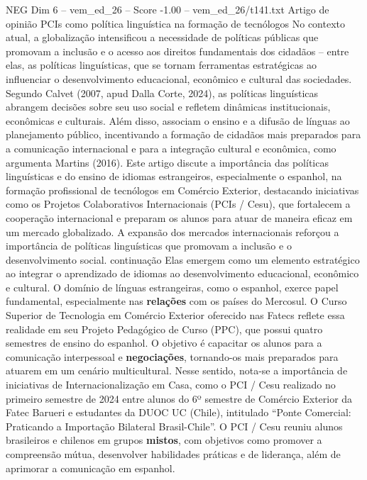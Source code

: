 \begin{textsample}{NEG Dim 6 – vem\_ed\_26 – Score -1.00 – vem\_ed\_26/t141.txt}  \label{ex:f6_neg_020}
Artigo de opinião PCIs como política linguística na formação de tecnólogos No contexto atual, a globalização intensificou a necessidade de políticas públicas que promovam a inclusão e o acesso aos direitos fundamentais dos cidadãos – entre elas, as políticas linguísticas, que se tornam ferramentas estratégicas ao influenciar o desenvolvimento educacional, econômico e cultural das sociedades.
Segundo Calvet (2007, apud Dalla Corte, 2024), as políticas linguísticas abrangem decisões sobre seu uso social e refletem dinâmicas institucionais, econômicas e culturais.
Além disso, associam o ensino e a difusão de línguas ao planejamento público, incentivando a formação de cidadãos mais preparados para a comunicação internacional e para a integração cultural e econômica, como argumenta Martins (2016).
Este artigo discute a importância das políticas linguísticas e do ensino de idiomas estrangeiros, especialmente o espanhol, na formação profissional de tecnólogos em Comércio Exterior, destacando iniciativas como os Projetos Colaborativos Internacionais (PCIs / Cesu), que fortalecem a cooperação internacional e preparam os alunos para atuar de maneira eficaz em um mercado globalizado.
A expansão dos mercados internacionais reforçou a importância de políticas linguísticas que promovam a inclusão e o desenvolvimento social. continuação Elas emergem como um elemento estratégico ao integrar o aprendizado de idiomas ao desenvolvimento educacional, econômico e cultural.
O domínio de línguas estrangeiras, como o espanhol, exerce papel fundamental, especialmente nas \textbf{relações} com os países do Mercosul.
O Curso Superior de Tecnologia em Comércio Exterior oferecido nas Fatecs reflete essa realidade em seu Projeto Pedagógico de Curso (PPC), que possui quatro semestres de ensino do espanhol.
O objetivo é capacitar os alunos para a comunicação interpessoal e \textbf{negociações}, tornando-os mais preparados para atuarem em um cenário multicultural.
Nesse sentido, nota-se a importância de iniciativas de Internacionalização em Casa, como o PCI / Cesu realizado no primeiro semestre de 2024 entre alunos do 6º semestre de Comércio Exterior da Fatec Barueri e estudantes da DUOC UC (Chile), intitulado “Ponte Comercial: Praticando a Importação Bilateral Brasil-Chile”.
O PCI / Cesu reuniu alunos brasileiros e chilenos em grupos \textbf{mistos}, com objetivos como promover a compreensão mútua, desenvolver habilidades práticas e de liderança, além de aprimorar a comunicação em espanhol.

\end{textsample}
